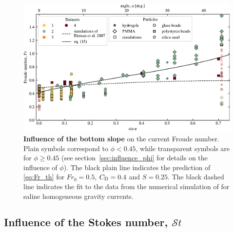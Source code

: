 \documentclass[12pt]{article}
\begin{document}
\begin{figure}[ht]
	\centering
	\includegraphics{figure4.pdf}
	\caption{\textbf{Influence of the bottom slope} on the current Froude number. Plain symbols correspond to $\phi < 0.45$, while transparent symbols are for $\phi \geq 0.45$ (see section~\ref{sec:influence_phi} for details on the influence of $\phi$). The black plain line indicates the prediction of \eqref{eq:Fr_th} for $Fr_{0} = 0.5$, $C_{\text D} = 0.4$ and $S = 0.25$. The black dashed line indicates the fit to the data from the numerical simulation of \citet{Birman2007} for saline homogeneous gravity currents.}
	\label{fig:fig4}
\end{figure}

\subsection{Influence of the Stokes number, $\mathcal{S}t$}
\label{sec:influence_stokes}
\end{document}
